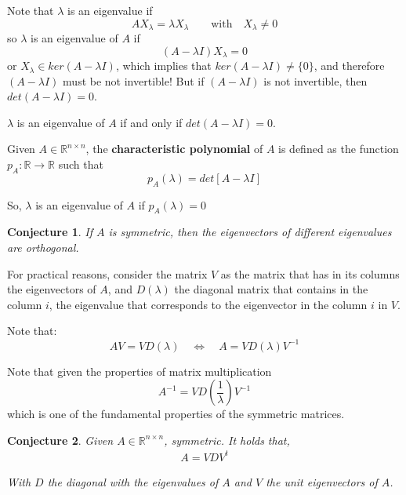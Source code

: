 \documentclass[aspectratio=169]{beamer}
\newtheorem{proposition}{Conjecture}[section]
\begin{document}
\begin{frame}
    Note that $\lambda$ is an eigenvalue if $$A X_{\lambda}=\lambda X_\lambda\quad\quad\text{with}\quad X_\lambda\neq0$$ so $\lambda$ is an eigenvalue of $A$ if $$(A-\lambda I)X_\lambda =0$$ or $X_\lambda\in ker(A-\lambda I)$, which implies that $ker(A-\lambda I)\neq \{0\}$, and therefore $(A-\lambda I)$ must be not invertible! But if $(A-\lambda I)$ is not invertible, then $det(A-\lambda I) = 0$. 
    
    \begin{corollary}
        $\lambda$ is an eigenvalue of $A$ if and only if $det(A-\lambda I)=0$.
    \end{corollary}
\end{frame}

\begin{frame}
    \begin{definition}
    Given $A\in\mathds{R}^{n\times n}$, the \textbf{characteristic polynomial} of $A$ is defined as the function $p_A:\mathds{R}\rightarrow\mathds{R}$ such that $$p_A(\lambda)=det[A-\lambda I]$$
    \end{definition}

    So, $\lambda$ is an eigenvalue of $A$ if $p_A(\lambda)=0$

\end{frame}

\begin{frame}
    \begin{proposition}
        If $A$ is symmetric, then the eigenvectors of different eigenvalues are orthogonal.
    \end{proposition}
    
    For practical reasons, consider the matrix $V$ as the matrix that has in its columns the eigenvectors of $A$, and $D(\lambda)$ the diagonal matrix that contains in the column $i$, the eigenvalue that corresponds to the eigenvector in the column $i$ in $V$.
    
    Note that:
    $$ A V = V D(\lambda)\quad\Leftrightarrow\quad A = V D(\lambda) V^{-1}$$
    
    Note that given the properties of matrix multiplication $$A^{-1}=V D\left(\frac{1}{\lambda}\right) V^{-1}$$ which is one of the fundamental properties of the symmetric matrices.
\end{frame}

\begin{frame}
    \begin{proposition}
        Given $A\in\mathds{R}^{n\times n}$, symmetric. It holds that,
        \begin{align*}
            A  = V D V^t
        \end{align*}
        
        With $D$ the diagonal with the eigenvalues of $A$ and $V$ the unit eigenvectors of $A$.
    \end{proposition}
\end{frame}
\end{document}
